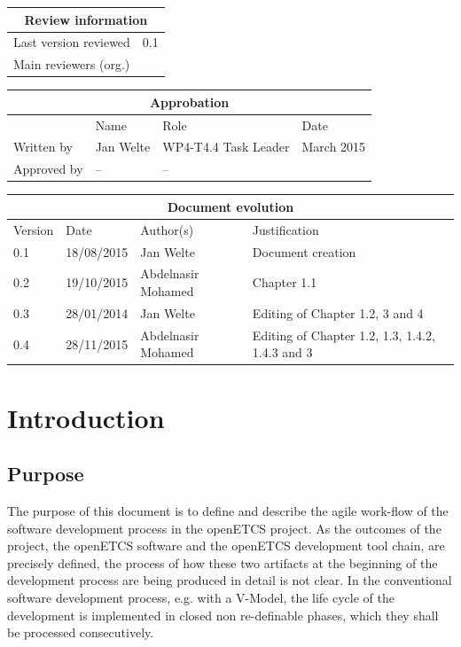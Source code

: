 \begin{tabular}{|p{4.4cm}|p{8.7cm}|}
\hline
\multicolumn{2}{|c|}{Review information} \\
\hline
Last version reviewed & 0.1 \\
\hline
Main reviewers (org.) & \\
\hline
\end{tabular}

\begin{tabular}{|p{2.2cm}|p{4cm}|p{4cm}|p{2cm}|}
\hline
\multicolumn{4}{|c|}{Approbation} \\
\hline
  &  Name & Role & Date   \\
\hline  
Written by    &  Jan Welte & WP4-T4.4 Task Leader  &  March 2015\\
\hline
Approved by & -- & -- & \\
\hline
\end{tabular}

\begin{tabular}{|p{2.2cm}|p{2cm}|p{4cm}|p{4cm}|}
\hline
\multicolumn{4}{|c|}{Document evolution} \\
\hline
Version &  Date & Author(s) & Justification  \\
\hline
0.1 & 18/08/2015 & Jan Welte &  Document creation \\
\hline 
0.2 & 19/10/2015 & Abdelnasir Mohamed & Chapter 1.1 \\
\hline  
0.3 & 28/01/2014 & Jan Welte & Editing of Chapter 1.2, 3 and 4  \\
\hline  
0.4 & 28/11/2015 & Abdelnasir Mohamed & Editing of Chapter 1.2, 1.3, 1.4.2, 1.4.3 and 3\\
\hline
\end{tabular}
\newpage


\mainmatter

\chapter{Introduction}
\label{sec:introduction}
 
\section{Purpose}
\label{sec:purpose}

The purpose of this document is to define and describe the agile work-flow of the software development process in the openETCS project. As the outcomes of the project, the openETCS software and the openETCS development tool chain, are precisely defined, the process of how these two artifacts at the beginning of the development process are being produced in detail is not clear. In the conventional software development  process, e.g. with a V-Model, the life cycle of the development is implemented in closed non re-definable phases, which they shall be processed consecutively. 

